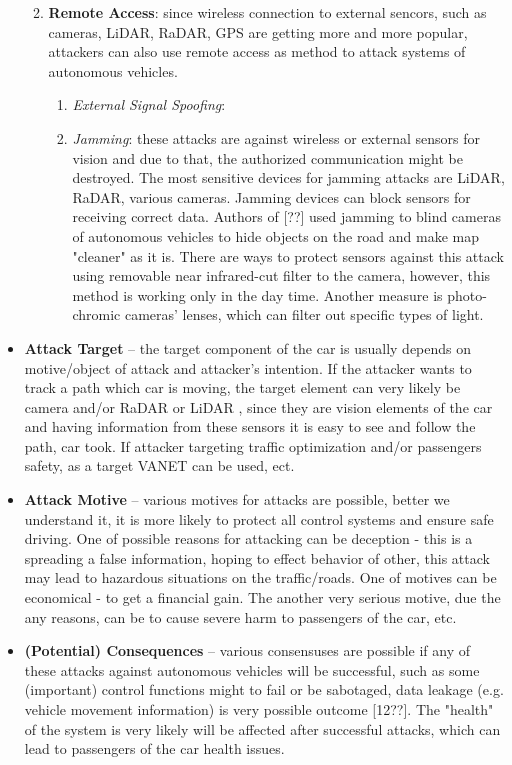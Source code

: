 \begin{itemize}
\begin{enumerate}
\begin{enumerate}
\begin{enumerate}
			\end{enumerate}
		\end{enumerate}
		\item \textbf{Remote Access}: since wireless connection to external sencors, such as cameras, \gls{LiDAR}, \gls{RaDAR}, \gls{GPS} are getting more and more popular, attackers can also use remote access as method to attack systems of autonomous vehicles. 
		\begin{enumerate}
			\item \textit{External Signal Spoofing}: 
			\item \textit{Jamming}: these attacks are against wireless or external sensors for vision and due to that, the authorized communication might be destroyed. The most sensitive devices for jamming attacks are \gls{LiDAR}, \gls{RaDAR}, various cameras. Jamming devices can block sensors for receiving correct data. Authors of [??] used jamming to blind cameras of autonomous vehicles to hide objects on the road and make map "cleaner" as it is. There are ways to protect sensors against this attack using removable near infrared-cut filter to the camera, however, this method is working only in the day time. Another measure is photo-chromic cameras' lenses, which can filter out specific types of light.
		\end{enumerate}    
	\end{enumerate}
		
	\item \textbf{Attack Target} -- the target component of the car is usually depends on motive/object of attack and attacker’s intention. If the attacker wants to track a path which car is moving, the target element can very likely be camera and/or \gls{RaDAR} or \gls{LiDAR} , since they are vision elements of the car and having information from these sensors it is easy to see and follow the path, car took. If attacker targeting traffic optimization and/or passengers safety, as a target \gls{VANET} can be used, ect.
	\item \textbf{Attack Motive} -- various motives for attacks are possible, better we understand it, it is more likely to protect all control systems and ensure safe driving. One of possible reasons for attacking can be deception - this is a spreading a false information, hoping to effect behavior of other, this attack may lead to hazardous situations on the traffic/roads. One of motives can be economical - to get a financial gain. The another very serious motive, due the any reasons, can be to cause severe harm to passengers of the car, etc.
	\item \textbf{(Potential) Consequences} -- various consensuses are possible if any of these attacks against autonomous vehicles will be successful, such as some (important) control functions might to fail or be sabotaged, data leakage (e.g. vehicle movement information) is very possible outcome [12??]. The "health" of the system is very likely will be affected after successful attacks, which can lead to passengers of the car health issues.
\end{itemize}

